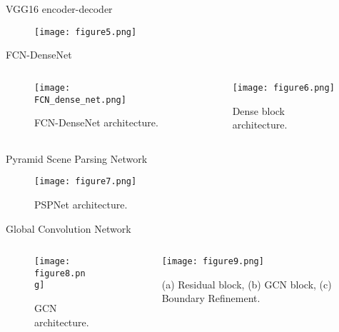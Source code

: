 \documentclass[10pt,aspectratio=169,dvipsnames]{beamer} %
\newcounter{angle}
\begin{document}
\begin{frame}{VGG16 encoder-decoder}
	\begin{figure}
		\centering
		\texttt{[image: figure5.png]}
	\end{figure}
\end{frame}

\begin{frame}{FCN-DenseNet}
	\begin{columns}[T]
		\begin{column}[c]{0.48\textwidth}
			\begin{figure}[h!]
				\texttt{[image: FCN\_dense\_net.png]}
				\caption{FCN-DenseNet architecture.} 
				\label{fcn}
			\end{figure}
		\end{column}
		\hfill
		\begin{column}[c]{0.48\textwidth}
			\begin{figure}[h!]
				\centering
				\texttt{[image: figure6.png]}
				\caption{Dense block architecture.} 
			\end{figure}
		\end{column}
	\end{columns}	
\end{frame}

\begin{frame}{Pyramid Scene Parsing Network}
	\begin{figure} [h!]
		\centering
		\texttt{[image: figure7.png]}
		\caption{PSPNet architecture.} 
	\end{figure}
\end{frame}

\begin{frame}{Global Convolution Network}
	\begin{columns}[T]
		\begin{column}[c]{0.55\textwidth}
			\begin{figure} [h!]
				\centering
				\texttt{[image: figure8.png]}
				\caption{GCN architecture.} 
			\end{figure}
		\end{column}
		\hfill
		\begin{column}[c]{0.35\textwidth}
			\begin{figure} [h!]
				\centering
				\texttt{[image: figure9.png]}
				\caption{(a) Residual block, (b) GCN block, (c) Boundary Refinement.} 
			\end{figure}
		\end{column}
	\end{columns}
\end{frame}
\end{document}
